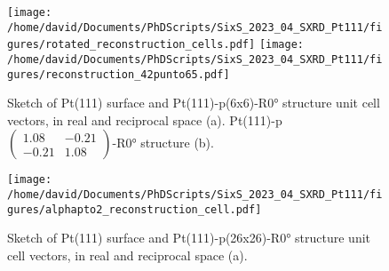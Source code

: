 

\begin{figure}[!htb]
    \centering
    \texttt{[image: /home/david/Documents/PhDScripts/SixS\_2023\_04\_SXRD\_Pt111/figures/rotated\_reconstruction\_cells.pdf]}
    \texttt{[image: /home/david/Documents/PhDScripts/SixS\_2023\_04\_SXRD\_Pt111/figures/reconstruction\_42punto65.pdf]}
    \caption{
    Sketch of Pt(111) surface and Pt(111)-p(6x6)-R\ang{0} structure unit cell vectors, in real and reciprocal space (a).
    Pt(111)-p$\begin{pmatrix} 1.08 & -0.21 \\ -0.21 & 1.08 \end{pmatrix}$-R\ang{0} structure (b).
    }
    \label{fig:Pt11180O2Structures}
\end{figure}

\begin{figure}[!htb]
    \centering
    \texttt{[image: /home/david/Documents/PhDScripts/SixS\_2023\_04\_SXRD\_Pt111/figures/alphapto2\_reconstruction\_cell.pdf]}
    \caption{
    Sketch of Pt(111) surface and Pt(111)-p(26x26)-R\ang{0} structure unit cell vectors, in real and reciprocal space (a).
    }
    \label{fig:Pt111AlphaPtO2}
\end{figure}


